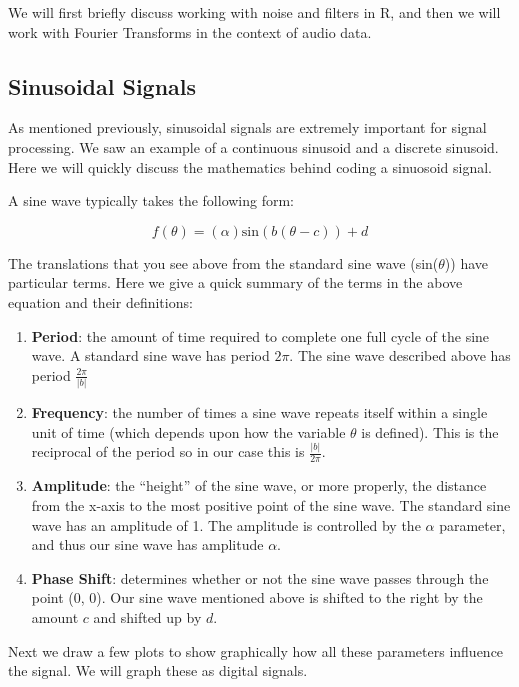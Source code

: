 \documentclass[]{krantz}
\providecommand{\tightlist}{%
  \setlength{\itemsep}{0pt}\setlength{\parskip}{0pt}}
\begin{document}
We will first briefly discuss working with noise and filters in R, and
then we will work with Fourier Transforms in the context of audio data.

\subsection{Sinusoidal Signals}\label{sinusoidal-signals}

As mentioned previously, sinusoidal signals are extremely important for
signal processing. We saw an example of a continuous sinusoid and a
discrete sinusoid. Here we will quickly discuss the mathematics behind
coding a sinuosoid signal.

A sine wave typically takes the following form:

\[
f(\theta) = (\alpha) \text{sin}(b(\theta - c)) + d
\]

The translations that you see above from the standard sine wave
(sin(\(\theta\))) have particular terms. Here we give a quick summary of
the terms in the above equation and their definitions:

\begin{enumerate}
\def\labelenumi{\arabic{enumi}.}
\tightlist
\item
  \textbf{Period}: the amount of time required to complete one full
  cycle of the sine wave. A standard sine wave has period \(2\pi\). The
  sine wave described above has period \(\frac{2\pi}{|b|}\)
\item
  \textbf{Frequency}: the number of times a sine wave repeats itself
  within a single unit of time (which depends upon how the variable
  \(\theta\) is defined). This is the reciprocal of the period so in our
  case this is \(\frac{|b|}{2\pi}\).
\item
  \textbf{Amplitude}: the ``height'' of the sine wave, or more properly,
  the distance from the x-axis to the most positive point of the sine
  wave. The standard sine wave has an amplitude of 1. The amplitude is
  controlled by the \(\alpha\) parameter, and thus our sine wave has
  amplitude \(\alpha\).
\item
  \textbf{Phase Shift}: determines whether or not the sine wave passes
  through the point (0, 0). Our sine wave mentioned above is shifted to
  the right by the amount \(c\) and shifted up by \(d\).
\end{enumerate}

Next we draw a few plots to show graphically how all these parameters
influence the signal. We will graph these as digital signals.
\end{document}
